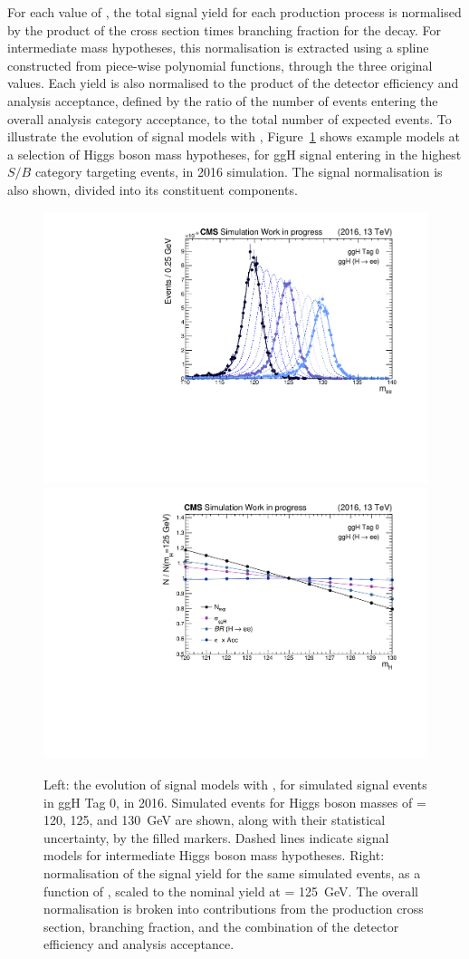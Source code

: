For each value of \mH, the total signal yield for each production process is normalised by the product of the cross section times branching fraction for the \Hee decay. For intermediate mass hypotheses, this normalisation is extracted using a spline constructed from piece-wise polynomial functions, through the three original \mH values. Each yield is also normalised to the product of the detector efficiency and analysis acceptance, defined by the ratio of the number of events entering the overall analysis category acceptance, to the total number of expected events. To illustrate the evolution of signal models with \mH, Figure~\ref{fig:sModels_vs_mh} shows example models at a selection of Higgs boson mass hypotheses, for ggH signal entering in the highest $S/B$ category targeting \ggH events, in 2016 simulation. The signal normalisation is also shown, divided into its constituent components.

\begin{figure}[htbp!]
\centering
\includegraphics[width =0.49\linewidth]{Figures/Hee/Results/sigModels/modelVsMHExample/GG2H_2016_gghcat0_13TeV_model_vs_mH.pdf}
\includegraphics[width =0.49\linewidth]{Figures/Hee/Results/sigModels/modelVsMHExample/GG2H_2016_gghcat0_13TeV_splines.pdf}
\caption[The signal model for \ggH events in the ggH Tag 0 analysis category, in 2016, as a function of the Higgs boson mass, alongside the signal normalisation.]{Left: the evolution of signal models with \mH, for simulated \ggH signal events in ggH Tag 0, in 2016. Simulated events for Higgs boson masses of \mH= 120, 125, and 130~GeV are shown, along with their statistical uncertainty, by the filled markers. Dashed lines indicate signal models for intermediate Higgs boson mass hypotheses. Right: normalisation of the signal yield for the same simulated events, as a function of \mH, scaled to the nominal yield at \mH= 125~GeV. The overall normalisation is broken into contributions from the production cross section, \Hee branching fraction, and the combination of the detector efficiency and analysis acceptance.}
\label{fig:sModels_vs_mh}
\end{figure}


